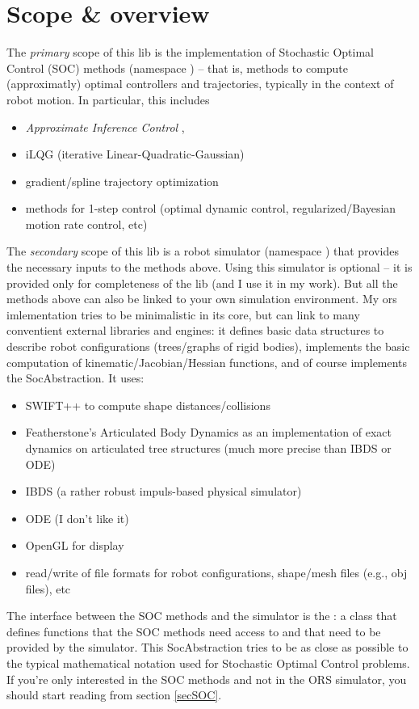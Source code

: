 \section{Scope \& overview}

The \emph{primary} scope of this lib is the implementation of
Stochastic Optimal Control (SOC) methods (namespace ) --
that is, methods to compute (approximatly) optimal controllers and
trajectories, typically in the context of robot motion. In particular,
this includes
\begin{itemize}
\item \emph{Approximate Inference Control} \cite{@-toussaint:09-icml},
\item iLQG (iterative Linear-Quadratic-Gaussian)
\item gradient/spline trajectory optimization
\item methods for 1-step control (optimal dynamic control,
regularized/Bayesian motion rate control, etc)
\end{itemize}

The \emph{secondary} scope of this lib is a robot simulator
(namespace ) that provides the necessary inputs to the
methods above. Using this simulator is optional -- it is provided only
for completeness of the lib (and I use it in my work). But all the
methods above can also be linked to your own simulation
environment. My ors imlementation tries to be minimalistic in its
core, but can link to many conventient external libraries and engines:
it defines basic data structures to describe robot configurations
(trees/graphs of rigid bodies), implements the basic computation of
kinematic/Jacobian/Hessian functions, and of course implements the
SocAbstraction. It uses:
\begin{itemize}
\item SWIFT++ to compute shape distances/collisions
\item Featherstone's Articulated Body Dynamics as an implementation of
exact dynamics on articulated tree structures (much more precise than
IBDS or ODE)
\item IBDS (a rather robust impuls-based physical simulator)
\item ODE (I don't like it)
\item OpenGL for display
\item read/write of file formats for robot configurations, shape/mesh
files (e.g., obj files), etc
\end{itemize}

The interface between the SOC methods and the simulator is
the : a class that defines functions that the SOC
methods need access to and that need to be provided by the
simulator. This SocAbstraction tries to be as close as possible to the
typical mathematical notation used for Stochastic Optimal Control
problems. If you're only interested in the SOC methods and not in the
ORS simulator, you should start reading from section \ref{secSOC}.



